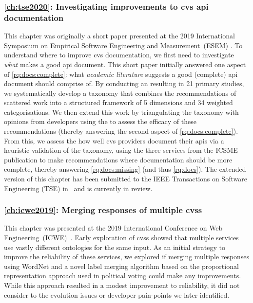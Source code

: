 \subsubsection{\cref{ch:tse2020}: Investigating improvements to \gls{cvs} \gls{api} documentation} This chapter was originally a short paper presented at the 2019 International Symposium on Empirical Software Engineering and Measurement~(ESEM) \citep{Cummaudo:2020icse}. To understand where to improve \gls{cvs} documentation, we first need to investigate \textit{what} makes a good \gls{api} document. This short paper initially answered one aspect of \ref{rq:docs:complete}: what \textit{academic literature} suggests a good (complete) \gls{api} document should comprise of. By conducting an  resulting in 21 primary studies, we systematically develop a taxonomy that combines the recommendations of scattered work into a structured framework of 5 dimensions and 34 weighted categorisations. We then extend this work by triangulating the taxonomy with opinions from developers using the  to assess the efficacy of these recommendations (thereby answering the second aspect of \ref{rq:docs:complete}). From this, we assess the how well \gls{cvs} providers document their \glspl{api} via a heuristic validation of the taxonomy, using the three services from the ICSME publication to make recommendations where documentation should be more complete, thereby answering \ref{rq:docs:missing} (and thus \ref{rq:docs}). The extended version of this chapter has been submitted to the IEEE Transactions on Software Engineering (TSE) in~\citep{Cummaudo:2020tse} and is currently in review.

\subsubsection{\cref{ch:icwe2019}: Merging responses of multiple \glspl{cvs}} This chapter was presented at the 2019 International Conference on Web Engineering~(ICWE)~\citep{Ohtake:2019vi}. Early exploration of \glspl{cvs} showed that multiple services use vastly different ontologies for the same input. As an initial strategy to improve the reliability of these services, we explored if merging multiple responses using WordNet \citep{WordNetMiller1995} and a novel label merging algorithm based on the proportional representation approach used in political voting could make any improvements. While this approach resulted in a modest improvement to reliability, it did not consider to the evolution issues or developer pain-points we later identified.


